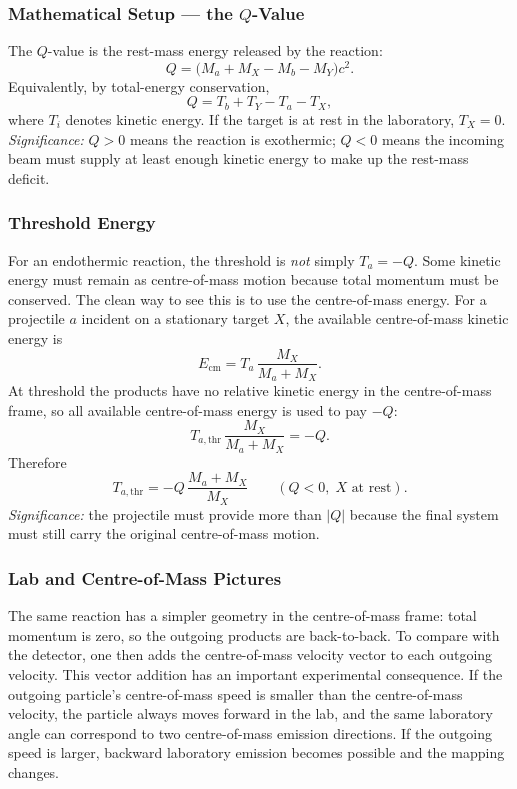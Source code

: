 \subsubsection*{Mathematical Setup --- the $Q$-Value}
The $Q$-value is the rest-mass energy released by the reaction:
\begin{equation}
  \label{eq:lec10:q_value}
  \boxed{
  Q = \bigl(M_a + M_X - M_b - M_Y\bigr)c^2.}
\end{equation}
Equivalently, by total-energy conservation,
\begin{equation}
  \label{eq:lec10:q_value_kinetic}
  \boxed{
  Q = T_b + T_Y - T_a - T_X,}
\end{equation}
where $T_i$ denotes kinetic energy. If the target is at rest in the laboratory,
$T_X=0$.
\textit{Significance:} $Q>0$ means the reaction is exothermic; $Q<0$ means the
incoming beam must supply at least enough kinetic energy to make up the rest-mass
deficit.

\subsubsection*{Threshold Energy}
For an endothermic reaction, the threshold is \emph{not} simply
$T_a=-Q$. Some kinetic energy must remain as centre-of-mass motion because total
momentum must be conserved. The clean way to see this is to use the
centre-of-mass energy. For a projectile $a$ incident on a stationary target $X$,
the available centre-of-mass kinetic energy is
\begin{equation}
  \label{eq:lec10:e_cm_lab}
  E_{\text{cm}} =
  T_a\,\frac{M_X}{M_a+M_X}.
\end{equation}
At threshold the products have no relative kinetic energy in the centre-of-mass
frame, so all available centre-of-mass energy is used to pay $-Q$:
\begin{equation}
  \label{eq:lec10:threshold_derivation}
  T_{a,\text{thr}}\,\frac{M_X}{M_a+M_X} = -Q.
\end{equation}
Therefore
\begin{equation}
  \label{eq:lec10:threshold}
  \boxed{
  T_{a,\text{thr}} =
  -Q\,\frac{M_a+M_X}{M_X}
  \qquad(Q<0,\; X\text{ at rest}).}
\end{equation}
\textit{Significance:} the projectile must provide more than $|Q|$ because the
final system must still carry the original centre-of-mass motion.

\subsubsection*{Lab and Centre-of-Mass Pictures}
The same reaction has a simpler geometry in the centre-of-mass frame: total
momentum is zero, so the outgoing products are back-to-back. To compare with the
detector, one then adds the centre-of-mass velocity vector to each outgoing
velocity. This vector addition has an important experimental consequence. If the
outgoing particle's centre-of-mass speed is smaller than the centre-of-mass
velocity, the particle always moves forward in the lab, and the same laboratory
angle can correspond to two centre-of-mass emission directions. If the outgoing
speed is larger, backward laboratory emission becomes possible and the mapping
changes.

